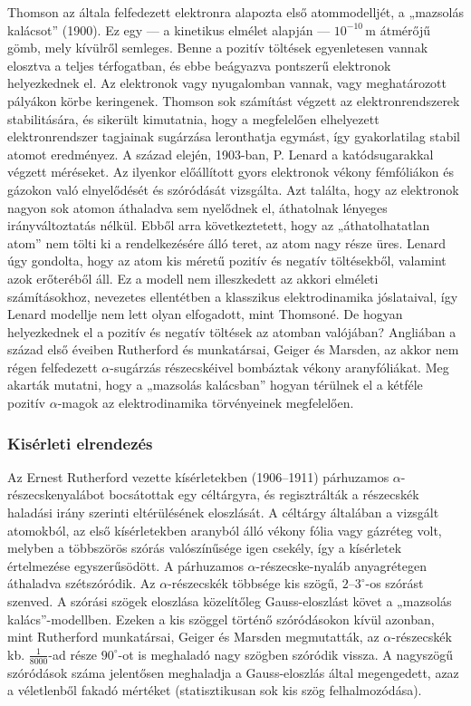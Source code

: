 \documentclass[../main.tex]{subfiles}
\begin{document}
Thomson az általa felfedezett elektronra alapozta első atommodelljét, a „mazsolás kalácsot” (1900). Ez egy — a kinetikus elmélet alapján — $10^{-10}\,\mathrm{m}$ átmérőjű gömb, mely kívülről semleges. Benne a pozitív töltések egyenletesen vannak elosztva a teljes térfogatban, és ebbe beágyazva pontszerű elektronok helyezkednek el.
Az elektronok vagy nyugalomban vannak, vagy meghatározott pályákon körbe keringenek. Thomson sok számítást végzett az elektronrendszerek stabilitására, és sikerült kimutatnia, hogy a megfelelően elhelyezett elektronrendszer tagjainak sugárzása leronthatja egymást, így gyakorlatilag stabil atomot eredményez. A század elején, 1903-ban, P. Lenard a katódsugarakkal végzett méréseket.
Az ilyenkor előállított gyors elektronok vékony fémfóliákon és gázokon való elnyelődését és szóródását vizsgálta. Azt találta, hogy az elektronok nagyon sok atomon áthaladva sem nyelődnek el, áthatolnak lényeges irányváltoztatás nélkül. Ebből arra következtetett, hogy az „áthatolhatatlan atom” nem tölti ki a rendelkezésére álló teret, az atom nagy része üres. Lenard úgy gondolta, hogy az atom kis méretű pozitív és negatív töltésekből, valamint azok erőteréből áll.
Ez a modell nem illeszkedett az akkori elméleti számításokhoz, nevezetes ellentétben a klasszikus elektrodinamika jóslataival, így Lenard modellje nem lett olyan elfogadott, mint Thomsoné. De hogyan helyezkednek el a pozitív és negatív töltések az atomban valójában? Angliában a század első éveiben Rutherford és munkatársai, Geiger és Marsden, az akkor nem régen felfedezett $\alpha$-sugárzás részecskéivel bombáztak vékony aranyfóliákat. Meg akarták mutatni, hogy a „mazsolás kalácsban” hogyan térülnek el a kétféle pozitív $\alpha$-magok az elektrodinamika törvényeinek megfelelően.

\subsubsection{Kisérleti elrendezés}
Az Ernest Rutherford vezette kísérletekben (1906--1911) párhuzamos
$\alpha$-részecskenyalábot bocsátottak egy céltárgyra, és regisztrálták
a részecskék haladási irány szerinti eltérülésének eloszlását.
A céltárgy általában a vizsgált atomokból, az első kísérletekben aranyból
álló vékony fólia vagy gázréteg volt, melyben a többszörös szórás
valószínűsége igen csekély, így a kísérletek értelmezése egyszerűsödött.
A párhuzamos $\alpha$-részecske-nyaláb anyagrétegen áthaladva
szétszóródik.
Az $\alpha$-részecskék többsége kis szögű, $2$--$3^\circ$-os szórást szenved.
A szórási szögek eloszlása közelítőleg Gauss-eloszlást követ a
„mazsolás kalács”-modellben.
Ezeken a kis szöggel történő szóródásokon kívül azonban, mint Rutherford
munkatársai, Geiger és Marsden megmutatták, az $\alpha$-részecskék kb.
$\tfrac{1}{8000}$-ad része $90^\circ$-ot is meghaladó nagy szögben
szóródik vissza.
A nagyszögű szóródások száma jelentősen meghaladja a Gauss-eloszlás
által megengedett, azaz a véletlenből fakadó mértéket
(statisztikusan sok kis szög felhalmozódása).
\end{document}
